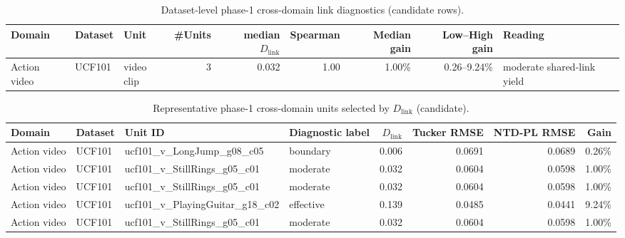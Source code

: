 
\begin{table}[t]
\centering
\caption{Dataset-level phase-1 cross-domain link diagnostics (candidate rows).}
\begin{tabular}{@{}l l l r r r r r l@{}}
\toprule
Domain & Dataset & Unit & \#Units & median $D_{\mathrm{link}}$ & Spearman & Median gain & Low--High gain & Reading \\
\midrule
Action video & UCF101 & video clip & 3 & 0.032 & 1.00 & 1.00\% & 0.26--9.24\% & moderate shared-link yield \\
\bottomrule
\end{tabular}
\end{table}

\begin{table}[t]
\centering
\caption{Representative phase-1 cross-domain units selected by $D_{\mathrm{link}}$ (candidate).}
\begin{tabular}{@{}l l l l r r r r@{}}
\toprule
Domain & Dataset & Unit ID & Diagnostic label & $D_{\mathrm{link}}$ & Tucker RMSE & NTD-PL RMSE & Gain \\
\midrule
Action video & UCF101 & ucf101_v_LongJump_g08_c05 & boundary & 0.006 & 0.0691 & 0.0689 & 0.26\% \\
Action video & UCF101 & ucf101_v_StillRings_g05_c01 & moderate & 0.032 & 0.0604 & 0.0598 & 1.00\% \\
Action video & UCF101 & ucf101_v_StillRings_g05_c01 & moderate & 0.032 & 0.0604 & 0.0598 & 1.00\% \\
Action video & UCF101 & ucf101_v_PlayingGuitar_g18_c02 & effective & 0.139 & 0.0485 & 0.0441 & 9.24\% \\
Action video & UCF101 & ucf101_v_StillRings_g05_c01 & moderate & 0.032 & 0.0604 & 0.0598 & 1.00\% \\
\bottomrule
\end{tabular}
\end{table}
